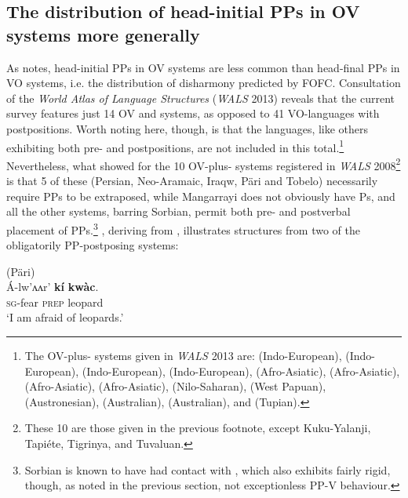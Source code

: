 \documentclass[output=paper]{LSP/langsci}
\begin{document}
\subsection{The distribution of head-initial PPs in OV systems more generally}\label{sec:biberauer:3.2}

As \citet{Sheehan2008,Sheehan2013fofc} notes, head-initial PPs in OV systems are less common than head-final PPs in VO systems, i.e. the distribution of disharmony predicted by FOFC. Consultation of the \textit{World Atlas of Language Structures} (\textit{WALS} 2013) reveals that the current survey features just 14 OV and  systems, as opposed to 41 VO-languages with postpositions. Worth noting here, though, is that the  languages, like others exhibiting both pre- and postpositions, are not included in this total.\footnote{The OV-plus- systems given in \textit{WALS} 2013 are:  (Indo-European),  (Indo-European),  (Indo-European),  (Indo-European),  (Afro-Asiatic),  (Afro-Asiatic),  (Afro-Asiatic),  (Afro-Asiatic),  (Nilo-Saharan),  (West Papuan),  (Austronesian),  (Australian),  (Australian), and  (Tupian).} Nevertheless, what \citet{Sheehan2008} showed for the 10 OV-plus- systems registered in \textit{WALS} 2008\footnote{These 10 are those given in the previous footnote, except Kuku-Yalanji, Tapiéte, Tigrinya, and Tuvaluan.} is that 5 of these (Persian, Neo-Aramaic, Iraqw, Päri and Tobelo) necessarily require PPs to be extraposed, while Mangarrayi does not obviously have Ps, and all the other systems, barring Sorbian, permit both pre- and postverbal placement of PPs.\footnote{Sorbian is known to have had contact with , which also exhibits fairly rigid, though, as noted in the previous section, not exceptionless PP-V behaviour.} , deriving from \citet[435--436]{Sheehan2013fofc}, illustrates structures from two of the obligatorily PP-postposing systems:

\ea%
\ea (Päri)\\
\gll Á-lw’ʌʌr’   \textbf{kí} \textbf{kwàc}.           \\
    \textsc{sg}-fear  \textsc{prep}  leopard\\

  \glt ‘I am afraid of leopards.’      \citep[303]{Anderson1988}
\end{document}
